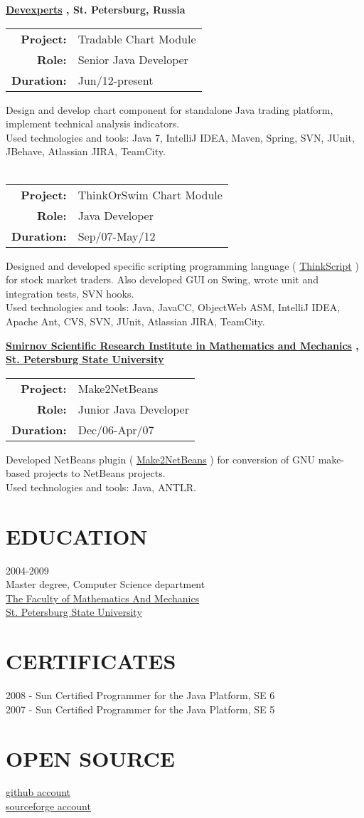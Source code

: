 \documentclass[margin,15pt]{res} %
\newcommand{\gli}[2] {
  {\color{Blue} \href{#1}{#2}}
}
\newcommand{\wsum}[3] {
\begin{tabular}{ r l }
\bf Project: & #1 \\
\bf Role: & #2 \\
\bf Duration: & #3  \\
\end{tabular}
}
\begin{document}
\begin{resume}
{\bf \gli{http://www.devexperts.com/en/index.html}{Devexperts}, St. Petersburg, Russia} \\
\wsum{Tradable Chart Module}{Senior Java Developer}{Jun/12-present}

Design and develop chart component for standalone Java trading platform, implement technical analysis indicators. \\
Used technologies and tools: Java 7, IntelliJ IDEA, Maven, Spring, SVN, JUnit, \\ JBehave, Atlassian JIRA, TeamCity. \\ \\
\wsum{ThinkOrSwim Chart Module}{Java Developer}{Sep/07-May/12}

  Designed and developed specific scripting programming language (\gli{http://team.thinkorswim.com/manual/dark/thinkscript/index.html}{ThinkScript}) for stock market traders. Also developed GUI on Swing, wrote unit and integration tests, SVN hooks. \\ 
Used technologies and tools: Java, JavaCC, ObjectWeb ASM, IntelliJ IDEA, Apache Ant, CVS, SVN, JUnit, Atlassian JIRA, TeamCity.

{\bf \gli{http://niimm.spbu.ru/tambur_eng.htm}{Smirnov Scientific Research Institute in Mathematics and Mechanics}, \\ \gli{http://spbu.ru/}{St. Petersburg State University}} \\
\wsum{Make2NetBeans}{Junior Java Developer}{Dec/06-Apr/07}

Developed NetBeans plugin (\gli{http://plugins.netbeans.org/PluginPortal/faces/PluginDetailPage.jsp?pluginid=1495}{Make2NetBeans}) for conversion of GNU make-based projects to NetBeans projects. \\ 
Used technologies and tools: Java, ANTLR.

\section{EDUCATION}       2004-2009 \\ 
                Master degree, Computer Science department  \\
                \gli{http://www.math.spbu.ru/en/index.html}{The Faculty of Mathematics And Mechanics} \\
		\gli{http://spbu.ru/}{St. Petersburg State University} \\
 
 
\section{CERTIFICATES}
2008 - Sun Certified Programmer for the Java Platform, SE 6 \\
2007 - Sun Certified Programmer for the Java Platform, SE 5 \\

\section{OPEN SOURCE} \gli{https://github.com/gark87}{github account} \\
    \gli{http://sourceforge.net/users/gark87}{sourceforge account}
\end{resume} 
\end{document}

